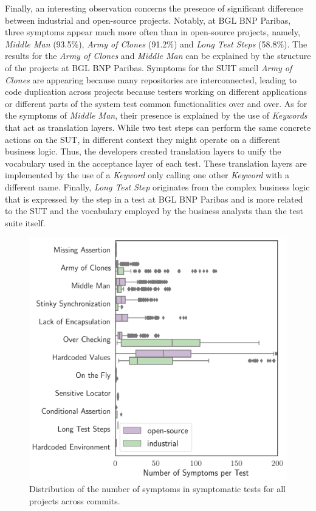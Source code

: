 Finally, an interesting observation concerns the presence of significant difference between industrial and open-source projects. Notably, at BGL BNP Paribas, three symptoms appear much more often than in open-source projects, namely, \emph{Middle Man} (93.5\%), \emph{Army of Clones} (91.2\%) and \emph{Long Test Steps} (58.8\%). The results for the \emph{Army of Clones} and \emph{Middle Man} can be explained by the structure of the projects at BGL BNP Paribas. Symptoms for the SUIT smell \emph{Army of Clones} are appearing because many repositories are interconnected, leading to code duplication across projects because testers working on different applications or different parts of the system test common functionalities over and over. As for the symptoms of \emph{Middle Man}, their presence is explained by the use of \emph{Keywords} that act as translation layers. While two test steps can perform the same concrete actions on the SUT, in different context they might operate on a different business logic. Thus, the developers created translation layers to unify the vocabulary used in the acceptance layer of each test. These translation layers are implemented by the use of a \emph{Keyword} only calling one other \emph{Keyword} with a different name. Finally, \emph{Long Test Step} originates from the complex business logic that is expressed by the step in a test at BGL BNP Paribas and is more related to the SUT and the vocabulary employed by the business analysts than the test suite itself.

\begin{figure}
\centering
\includegraphics[width=0.9\linewidth]{figures/smells/smell-raw-value-200-distribution-boxplot.png}
\caption{Distribution of the number of symptoms in symptomatic tests for all projects across commits.}  
\label{fig:raw-smells-distribution}
\end{figure}

